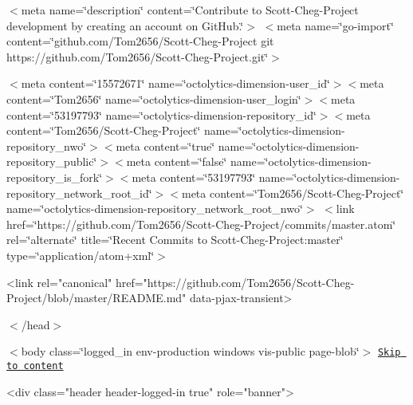 $<$meta name=\char`\"{}description\char`\"{} content=\char`\"{}\+Contribute to Scott-\/\+Cheg-\/\+Project development by creating an account on Git\+Hub.\char`\"{}$>$ $<$meta name=\char`\"{}go-\/import\char`\"{} content=\char`\"{}github.\+com/\+Tom2656/\+Scott-\/\+Cheg-\/\+Project git https\+://github.\+com/\+Tom2656/\+Scott-\/\+Cheg-\/\+Project.\+git\char`\"{}$>$

$<$meta content=\char`\"{}15572671\char`\"{} name=\char`\"{}octolytics-\/dimension-\/user\+\_\+id\char`\"{}$>$$<$meta content=\char`\"{}\+Tom2656\char`\"{} name=\char`\"{}octolytics-\/dimension-\/user\+\_\+login\char`\"{}$>$$<$meta content=\char`\"{}53197793\char`\"{} name=\char`\"{}octolytics-\/dimension-\/repository\+\_\+id\char`\"{}$>$$<$meta content=\char`\"{}\+Tom2656/\+Scott-\/\+Cheg-\/\+Project\char`\"{} name=\char`\"{}octolytics-\/dimension-\/repository\+\_\+nwo\char`\"{}$>$$<$meta content=\char`\"{}true\char`\"{} name=\char`\"{}octolytics-\/dimension-\/repository\+\_\+public\char`\"{}$>$$<$meta content=\char`\"{}false\char`\"{} name=\char`\"{}octolytics-\/dimension-\/repository\+\_\+is\+\_\+fork\char`\"{}$>$$<$meta content=\char`\"{}53197793\char`\"{} name=\char`\"{}octolytics-\/dimension-\/repository\+\_\+network\+\_\+root\+\_\+id\char`\"{}$>$$<$meta content=\char`\"{}\+Tom2656/\+Scott-\/\+Cheg-\/\+Project\char`\"{} name=\char`\"{}octolytics-\/dimension-\/repository\+\_\+network\+\_\+root\+\_\+nwo\char`\"{}$>$ $<$link href=\char`\"{}https\+://github.\+com/\+Tom2656/\+Scott-\/\+Cheg-\/\+Project/commits/master.\+atom\char`\"{} rel=\char`\"{}alternate\char`\"{} title=\char`\"{}\+Recent Commits to Scott-\/\+Cheg-\/\+Project\+:master\char`\"{} type=\char`\"{}application/atom+xml\char`\"{}$>$

\begin{DoxyVerb}  <link rel="canonical" href="https://github.com/Tom2656/Scott-Cheg-Project/blob/master/README.md" data-pjax-transient>
\end{DoxyVerb}
 $<$/head$>$

$<$body class=\char`\"{}logged\+\_\+in   env-\/production windows vis-\/public page-\/blob\char`\"{}$>$ \href{#start-of-content}{\tt Skip to content}

\begin{DoxyVerb}  <div class="header header-logged-in true" role="banner">
\end{DoxyVerb}
 

 \href{https://github.com/}{\tt }

